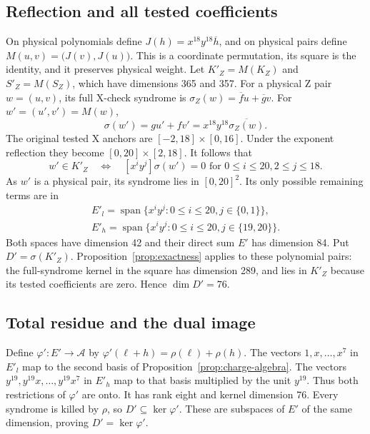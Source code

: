 \documentclass{article}
\DeclareMathOperator{\Span}{span}
\begin{document}
\subsection{Reflection and all tested coefficients}\label{sec:z-reflection}

On physical polynomials define \(J(h) = x^{18} y^{18} \overline{h}\), and on physical pairs
define \(M(u,v) = \bigl(J(v), J(u)\bigr)\). This is a coordinate permutation, its square is
the identity, and it preserves physical weight. Let \(K'_Z = M(K_Z)\) and
\(S'_Z = M(S_Z)\), which have dimensions 365 and 357. For a physical Z pair \(w = (u,v)\),
its full X-check syndrome is \(\sigma_Z(w) = \overline{f} u + \overline{g} v\). For
\(w' = (u', v') = M(w)\),
\begin{equation}
  \sigma(w') = g u' + f v' = x^{18} y^{18} \overline{\sigma_Z(w)}.
\end{equation}
The original tested X anchors are \([-2,18] \times [0,16]\). Under the exponent reflection
they become \([0,20] \times [2,18]\). It follows that
\begin{equation}
  w' \in K'_Z \quad \Longleftrightarrow \quad
  [x^i y^j]\sigma(w') = 0
  \text{ for } 0 \le i \le 20, 2 \le j \le 18.
\end{equation}
As \(w'\) is a physical pair, its syndrome lies in \([0,20]^2\). Its only possible remaining
terms are in
\begin{gather}
  E'_l = \Span\{x^i y^j : 0 \le i \le 20, j \in \{0,1\}\}, \\
  E'_h = \Span\{x^i y^j : 0 \le i \le 20, j \in \{19,20\}\}.
\end{gather}
Both spaces have dimension 42 and their direct sum \(E'\) has dimension 84. Put
\(D' = \sigma(K'_Z)\). Proposition~\ref{prop:exactness} applies to these polynomial pairs: the
full-syndrome kernel in the square has dimension 289, and lies in \(K'_Z\) because its tested
coefficients are zero. Hence \(\dim D' = 76\).

\subsection{Total residue and the dual image}\label{sec:z-residue}

Define \(\varphi' \colon E' \to \mathcal{A}\) by
\(\varphi'(\ell + h) = \rho(\ell) + \rho(h)\). The vectors \(1, x, \dots, x^7\) in \(E'_l\)
map to the second basis of Proposition~\ref{prop:charge-algebra}. The vectors
\(y^{19}, y^{19} x, \dots, y^{19} x^7\) in \(E'_h\) map to that basis multiplied by the unit
\(y^{19}\). Thus both restrictions of \(\varphi'\) are onto. It has rank eight and kernel
dimension 76. Every syndrome is killed by \(\rho\), so \(D' \subseteq \ker \varphi'\). These
are subspaces of \(E'\) of the same dimension, proving \(D' = \ker \varphi'\).
\end{document}
